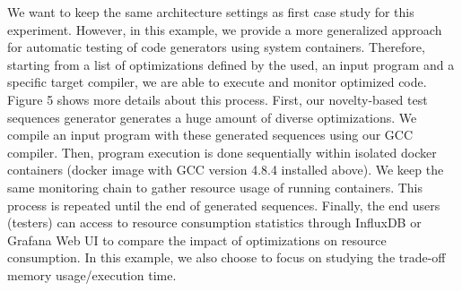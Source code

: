 We want to keep the same architecture settings as first case study for this experiment. However, in this example, we provide a more generalized approach for automatic testing of code generators using system containers. 
Therefore, starting from a list of  optimizations defined by the used, an input program and a specific target compiler, we are able to execute and monitor optimized code. 
Figure 5 shows more details about this process. First, our novelty-based test sequences generator generates a huge amount of diverse optimizations. 
We compile an input program with these generated sequences using our GCC compiler. 
Then, program execution is done sequentially within isolated docker containers (docker image with GCC version 4.8.4 installed above). 
We keep the same monitoring chain to gather resource usage of running containers. 
This process is repeated until the end of generated sequences. 
Finally, the end users (testers) can access to resource consumption statistics through InfluxDB or Grafana Web UI to compare the impact of optimizations on resource consumption. 
In this example, we also choose to focus on studying the trade-off memory usage/execution time.

